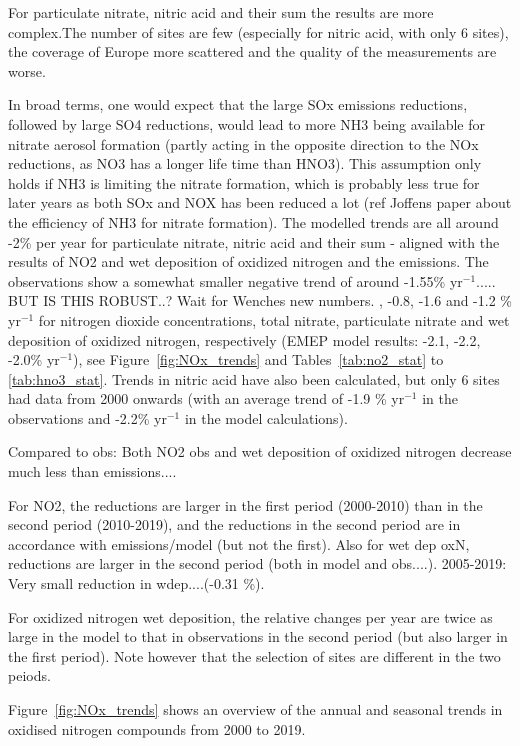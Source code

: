 For particulate nitrate, nitric acid and their sum the results are more complex.The number of sites are few (especially for nitric acid, with only 6 sites), the coverage of Europe more scattered and the quality of the measurements are worse. 

In broad terms, one would expect that the large SOx emissions reductions, followed by large SO4 reductions, would lead to more NH3 being available for nitrate aerosol formation (partly acting in the opposite direction to the NOx reductions, as NO3 has a longer life time than HNO3). This assumption only holds if NH3 is limiting the nitrate formation, which is probably less true for later years as both SOx and NOX has been reduced a lot (ref Joffens paper about the efficiency of NH3 for nitrate formation). The modelled trends are all around -2\% per year for particulate nitrate, nitric acid and their sum - aligned with the results of NO2 and wet deposition of oxidized nitrogen and the emissions. The observations show a somewhat smaller negative trend of around -1.55\% yr$^{-1}$..... BUT IS THIS ROBUST..? Wait for Wenches new numbers.
, -0.8, -1.6 and -1.2 \% yr$^{-1}$ for nitrogen dioxide concentrations, total nitrate, particulate nitrate and wet deposition of oxidized nitrogen, respectively (EMEP model results: -2.1, -2.2, -2.0\% yr$^{-1}$), see Figure~\ref{fig:NOx_trends} and Tables~\ref{tab:no2_stat} to \ref{tab:hno3_stat}. Trends in nitric acid have also been calculated, but only 6 sites had data from 2000 onwards (with an average trend of -1.9 \% yr$^{-1}$ in the observations and -2.2\% yr$^{-1}$ in the model calculations). 

Compared to obs: Both NO2 obs and wet deposition of oxidized nitrogen decrease much less than emissions....

For NO2, the reductions are larger in the first period (2000-2010) than in the second period (2010-2019), and the reductions in the second period are in accordance with emissions/model (but not the first). Also for wet dep oxN, reductions are larger in the second period (both in model and obs....). 2005-2019: Very small reduction in wdep....(-0.31 \%).

For oxidized nitrogen wet deposition, the relative changes per year are twice as large in the model to that in observations in the second period (but also larger in the first period). Note however that the selection of sites are different in the two peiods.


Figure~\ref{fig:NOx_trends} shows an overview of the annual and seasonal trends in oxidised nitrogen compounds from 2000 to 2019.

